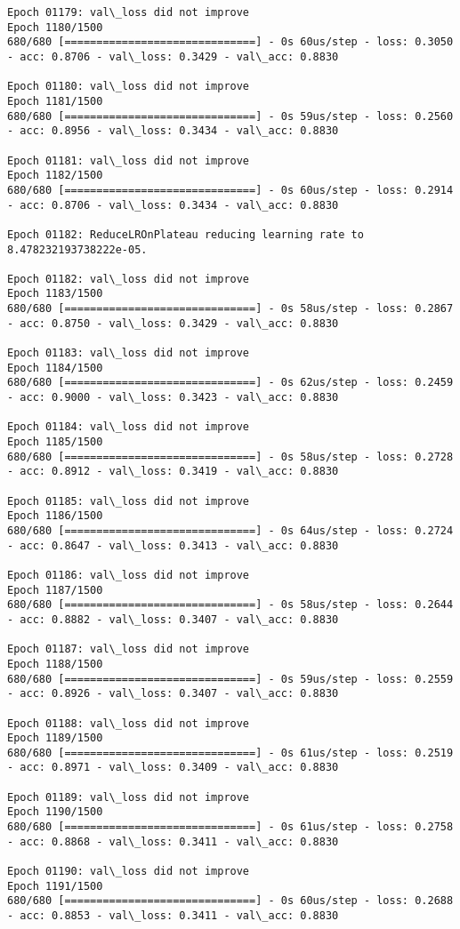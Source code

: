 \documentclass[11pt]{article}
\begin{document}
\begin{Verbatim}[commandchars=\\\{\}]
Epoch 01179: val\_loss did not improve
Epoch 1180/1500
680/680 [==============================] - 0s 60us/step - loss: 0.3050 - acc: 0.8706 - val\_loss: 0.3429 - val\_acc: 0.8830

Epoch 01180: val\_loss did not improve
Epoch 1181/1500
680/680 [==============================] - 0s 59us/step - loss: 0.2560 - acc: 0.8956 - val\_loss: 0.3434 - val\_acc: 0.8830

Epoch 01181: val\_loss did not improve
Epoch 1182/1500
680/680 [==============================] - 0s 60us/step - loss: 0.2914 - acc: 0.8706 - val\_loss: 0.3434 - val\_acc: 0.8830

Epoch 01182: ReduceLROnPlateau reducing learning rate to 8.478232193738222e-05.

Epoch 01182: val\_loss did not improve
Epoch 1183/1500
680/680 [==============================] - 0s 58us/step - loss: 0.2867 - acc: 0.8750 - val\_loss: 0.3429 - val\_acc: 0.8830

Epoch 01183: val\_loss did not improve
Epoch 1184/1500
680/680 [==============================] - 0s 62us/step - loss: 0.2459 - acc: 0.9000 - val\_loss: 0.3423 - val\_acc: 0.8830

Epoch 01184: val\_loss did not improve
Epoch 1185/1500
680/680 [==============================] - 0s 58us/step - loss: 0.2728 - acc: 0.8912 - val\_loss: 0.3419 - val\_acc: 0.8830

Epoch 01185: val\_loss did not improve
Epoch 1186/1500
680/680 [==============================] - 0s 64us/step - loss: 0.2724 - acc: 0.8647 - val\_loss: 0.3413 - val\_acc: 0.8830

Epoch 01186: val\_loss did not improve
Epoch 1187/1500
680/680 [==============================] - 0s 58us/step - loss: 0.2644 - acc: 0.8882 - val\_loss: 0.3407 - val\_acc: 0.8830

Epoch 01187: val\_loss did not improve
Epoch 1188/1500
680/680 [==============================] - 0s 59us/step - loss: 0.2559 - acc: 0.8926 - val\_loss: 0.3407 - val\_acc: 0.8830

Epoch 01188: val\_loss did not improve
Epoch 1189/1500
680/680 [==============================] - 0s 61us/step - loss: 0.2519 - acc: 0.8971 - val\_loss: 0.3409 - val\_acc: 0.8830

Epoch 01189: val\_loss did not improve
Epoch 1190/1500
680/680 [==============================] - 0s 61us/step - loss: 0.2758 - acc: 0.8868 - val\_loss: 0.3411 - val\_acc: 0.8830

Epoch 01190: val\_loss did not improve
Epoch 1191/1500
680/680 [==============================] - 0s 60us/step - loss: 0.2688 - acc: 0.8853 - val\_loss: 0.3411 - val\_acc: 0.8830


\end{Verbatim}
\end{document}
